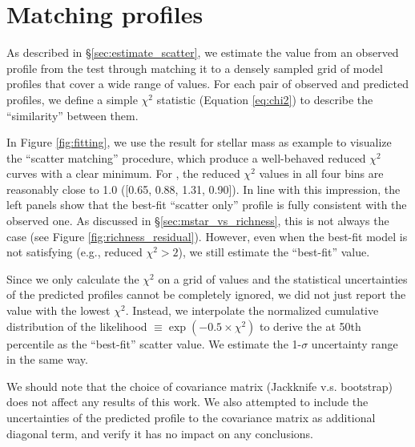 \documentclass[fleqn,usenatbib,useAMS,english]{mnras}
\begin{document}
\section{Matching \dsigma{} profiles}
    \label{app:fitting}

    As described in \S \ref{sec:estimate_scatter}, we estimate the \sigmh{} value
    from an observed \dsigma{} profile from the \topn{} test through matching it to a densely
    sampled grid of model \dsigma{} profiles that cover a wide range of \sigmh{}
    values.
    For each pair of observed and predicted \dsigma{} profiles, we define a simple $\chi^2$
    statistic (Equation \ref{eq:chi2}) to describe the ``similarity'' between them.

    In Figure \ref{fig:fitting}, we use the \topn{} result for  stellar mass as example
    to visualize the ``scatter matching'' procedure, which produce a well-behaved reduced $\chi^2$
    curves with a clear minimum.
    For , the reduced $\chi^2$ values in all four \topn{} bins are reasonably close
    to 1.0 ([0.65, 0.88, 1.31, 0.90]).
    In line with this impression, the left panels show that the best-fit ``scatter only'' \dsigma{}
    profile is fully consistent with the observed one.
    As discussed in \S \ref{sec:mstar_vs_richness}, this is not always the case (see
    Figure \ref{fig:richness_residual}).
    However, even when the best-fit model is not satisfying (e.g., reduced $\chi^2 >2$), we still
    estimate the ``best-fit'' \sigmh{} value.

    Since we only calculate the $\chi^2$ on a grid of \sigmh{} values and the statistical
    uncertainties of the predicted \dsigma{} profiles cannot be completely ignored, we did not
    just report the \sigmh{} value with the lowest $\chi^2$.
    Instead, we interpolate the normalized cumulative distribution of the likelihood $\equiv
    \exp{(-0.5 \times \chi^2)}$ to derive the \sigmh{} at 50th percentile as the ``best-fit''
    scatter value.
    We estimate the 1-$\sigma$ uncertainty range in the same way.

    We should note that the choice of covariance matrix (Jackknife v.s. bootstrap) does not
    affect any results of this work.
    We also attempted to include the uncertainties of the predicted \dsigma{} profile to the
    covariance matrix as additional diagonal term, and verify it has no impact on any
    conclusions.
\end{document}
